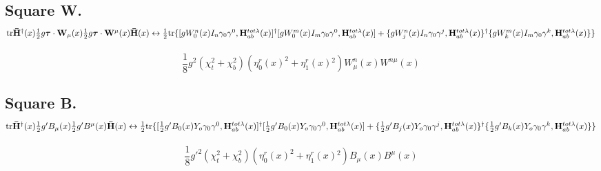 \documentclass[12pt]{article}
\renewcommand\[{\begin{dmath}}
\renewcommand\]{\end{dmath}}
\newcommand{\boldmathtau}{\mbox{\boldmath$\tau$\unboldmath}}
\begin{document}

\subsection {Square W.   ${ \rm tr  }{\bf \bar  H}^\dagger(x) \frac{1}{2}g  {\boldmathtau}\cdot {{\bf W}_\mu}(x) \frac{1}{2}g  {\boldmathtau}\cdot {{\bf W}^\mu}(x){\bf \bar H}(x)
\leftrightarrow  \\ \frac{1}{2} { \rm tr  }
   \{ [ {  g W_0^n(x) I_n} \gamma_0 \gamma^0 ,{\bf H}_{ab}^{tot\lambda }(x) ]^\dagger
[ {  g W_0^m(x) I_m} \gamma_0 \gamma^0 ,{\bf H}_{ab}^{tot\lambda }(x) ]+ \\  \{{  g W_j^n(x) I_n} \gamma_0 \gamma^j ,{\bf H}_{ab}^{tot\lambda }(x) \}^\dagger
\{ {  g W_k^m(x) I_m} \gamma_0 \gamma^k ,{\bf H}_{ab}^{tot\lambda }(x) \} \} $ }
\[
 \frac{1}{8}{g}^2  \left(\chi _t^2+\chi _{ b}^2\right) \left( \eta _0^r{} (x) ^2+\eta _1^r(x){}^2\right) W_{\mu }^n(x) W^{n \mu }  (x)
\]

\subsection {Square B. ${ \rm tr  }{\bf \bar H}^\dagger(x)\frac{1}{2}g'B_\mu(x)\frac{1}{2}g'B^\mu(x){\bf \bar H}(x)
\leftrightarrow \\ \frac{1}{2} { \rm tr  }
   \{ [ {  \frac{1}{2}g' B_0(x) Y_o} \gamma_0 \gamma^0 ,{\bf H}_{ab}^{tot\lambda }(x) ]^\dagger
[ {  \frac{1}{2}g' B_0(x) Y_o} \gamma_0 \gamma^0 ,{\bf H}_{ab}^{tot\lambda }(x) ]+   \\ \{{  \frac{1}{2}g' B_j(x) Y_o} \gamma_0 \gamma^j ,{\bf H}_{ab}^{tot\lambda }(x) \}^\dagger
\{ {  \frac{1}{2}g' B_k(x) Y_o} \gamma_0 \gamma^k ,{\bf H}_{ab}^{tot\lambda }(x) \} \}    $ }
\[
 \frac{1}{8}{g'}^2 \left(\chi_t^2+\chi_b^2\right)  \left(  \eta_0 ^r{}(x) ^2+\eta _1^r(x){}^2\right) B_{\mu }(x) B^{\mu }(x)
\]
\end{document}
